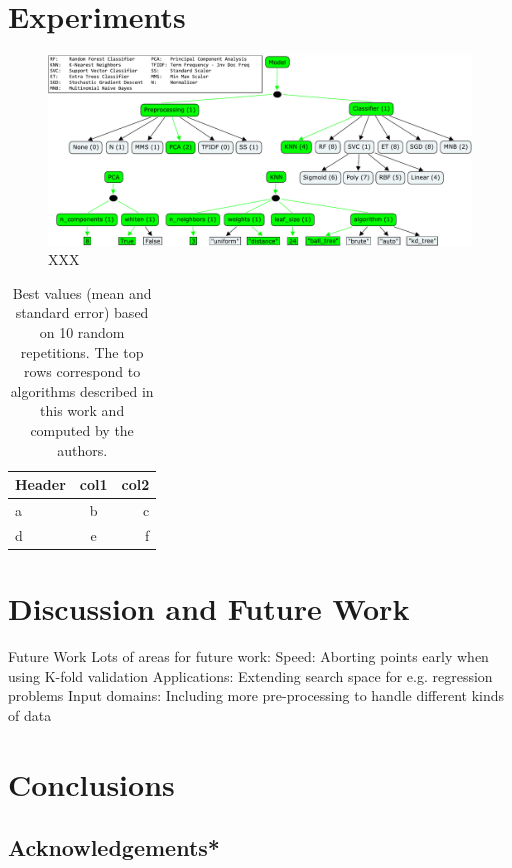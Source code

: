 \documentclass[wcp]{jmlr}
\begin{document}
\section{Experiments}

\begin{figure}
    \centering
    \includegraphics[width=\textwidth]{graphics/sklearn_space_all_together}
    \caption{
	    XXX
    }
    \label{fig:boxplots}
\end{figure}



\begin{table}
    \caption{
        Best values (mean and standard error) based on 10 random repetitions.
        The top rows correspond to algorithms described in this work and computed by the authors.
    }
    \label{tbl:acc}
    \centering
    \small
    \begin{tabular}{l|cr}
        \hline
        Header & col1 & col2 \\
        \hline
        a & b & c \\
        d & e & f
    \end{tabular}
\end{table}



\section{Discussion and Future Work}
Future Work
Lots of areas for future work:
Speed: Aborting points early when using K-fold validation
Applications: Extending search space for e.g. regression problems
Input domains: Including more pre-processing to handle different kinds of data


\section{Conclusions}


\subsection{Acknowledgements*}


\end{document}
